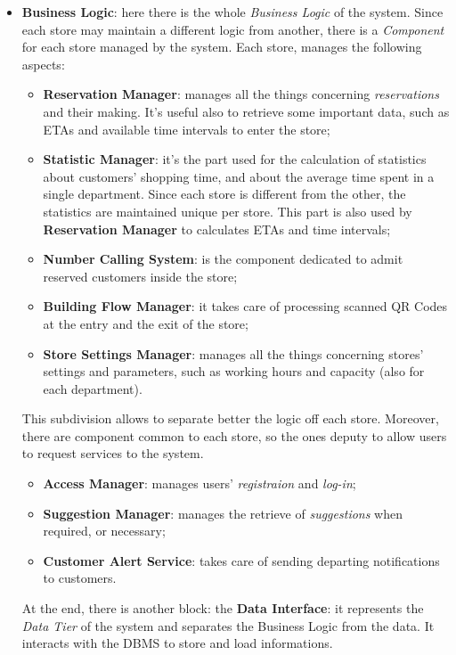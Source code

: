 \documentclass{article}
\begin{document}
\begin{itemize}
		\item{\bfseries Business Logic}: here there is the whole \emph{Business Logic} of the system. Since each store may maintain a different logic from another, there is a \emph{Component} for each store managed by the system. Each store, manages the following aspects:
		\begin{itemize}
			\item{\bfseries Reservation Manager}: manages all the things concerning \emph{reservations} and their making. It's useful also to retrieve some important data, such as ETAs and available time intervals to enter the store;
			\item{\bfseries Statistic Manager}: it's the part used for the calculation of statistics about customers' shopping time, and about the average time spent in a single department. Since each store is different from the other, the statistics are maintained unique per store. This part is also used by \textbf{Reservation Manager} to calculates ETAs and time intervals;
			\item{\bfseries Number Calling System}: is the component dedicated to admit reserved customers inside the store;
			\item{\bfseries Building Flow Manager}: it takes care of processing scanned QR Codes at the entry and the exit of the store;
			\item{\bfseries Store Settings Manager}: manages all the things concerning stores' settings and parameters, such as working hours and capacity (also for each department).
			
		\end{itemize} This subdivision allows to separate better the logic off each store. Moreover, there are component common to each store, so the ones deputy to allow users to request services to the system.
		\begin{itemize}
			\item {\bfseries Access Manager}: manages users' \emph{registraion} and \emph{log-in};
			\item {\bfseries Suggestion Manager}: manages the retrieve of \emph{suggestions} when required, or necessary;
			\item{\bfseries Customer Alert Service}: takes care of sending departing notifications to customers.
		\end{itemize}
	At the end, there is another block: the \textbf{Data Interface}: it represents the \emph{Data Tier} of the system and separates the Business Logic from the data. It interacts with the DBMS to store and load informations.
	\end{itemize}
\end{document}
